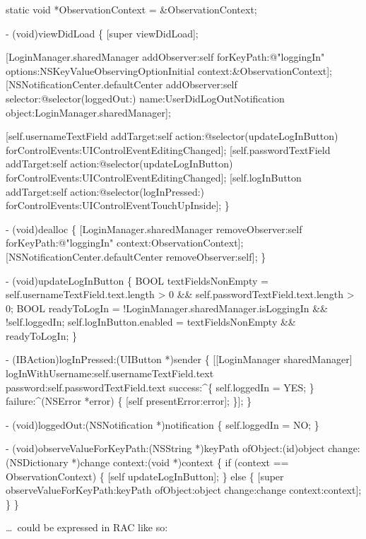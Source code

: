 \begin{DoxyCode}
static void *ObservationContext = &ObservationContext;

- (void)viewDidLoad \{
    [super viewDidLoad];

    [LoginManager.sharedManager addObserver:self forKeyPath:@"loggingIn"
       options:NSKeyValueObservingOptionInitial context:&ObservationContext];
    [NSNotificationCenter.defaultCenter addObserver:self selector:@selector(loggedOut:)
       name:UserDidLogOutNotification object:LoginManager.sharedManager];

    [self.usernameTextField addTarget:self action:@selector(updateLogInButton)
       forControlEvents:UIControlEventEditingChanged];
    [self.passwordTextField addTarget:self action:@selector(updateLogInButton)
       forControlEvents:UIControlEventEditingChanged];
    [self.logInButton addTarget:self action:@selector(logInPressed:)
       forControlEvents:UIControlEventTouchUpInside];
\}

- (void)dealloc \{
    [LoginManager.sharedManager removeObserver:self forKeyPath:@"loggingIn" context:ObservationContext];
    [NSNotificationCenter.defaultCenter removeObserver:self];
\}

- (void)updateLogInButton \{
    BOOL textFieldsNonEmpty = self.usernameTextField.text.length > 0 && self.passwordTextField.text.length
       > 0;
    BOOL readyToLogIn = !LoginManager.sharedManager.isLoggingIn && !self.loggedIn;
    self.logInButton.enabled = textFieldsNonEmpty && readyToLogIn;
\}

- (IBAction)logInPressed:(UIButton *)sender \{
    [[LoginManager sharedManager]
        logInWithUsername:self.usernameTextField.text
        password:self.passwordTextField.text
        success:^\{
            self.loggedIn = YES;
        \} failure:^(NSError *error) \{
            [self presentError:error];
        \}];
\}

- (void)loggedOut:(NSNotification *)notification \{
    self.loggedIn = NO;
\}

- (void)observeValueForKeyPath:(NSString *)keyPath ofObject:(id)object change:(NSDictionary *)change
       context:(void *)context \{
    if (context == ObservationContext) \{
        [self updateLogInButton];
    \} else \{
        [super observeValueForKeyPath:keyPath ofObject:object change:change context:context];
    \}
\}
\end{DoxyCode}


… could be expressed in R\+AC like so\+:


